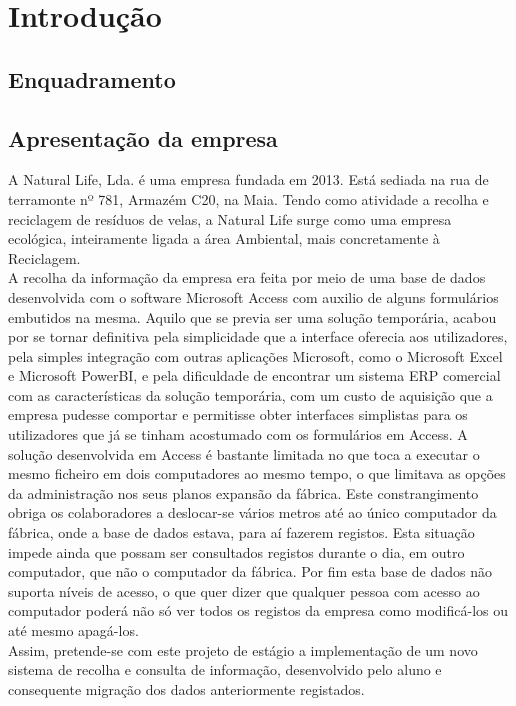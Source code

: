 \chapter{Introdução}
\label{cap:1}

\section{Enquadramento}

\section{Apresentação da empresa}
A Natural Life, Lda. é uma empresa fundada em 2013. Está sediada na rua de terramonte nº 781, Armazém C20, na Maia. Tendo como atividade a recolha e reciclagem de resíduos de velas, a Natural Life surge como uma empresa ecológica, inteiramente ligada a área Ambiental, mais concretamente à Reciclagem.\cite{NaturalLife}\\
A recolha da informação da empresa era feita por meio de uma base de dados desenvolvida com o software Microsoft Access\label{sym:MS_ACCESS} com auxilio de alguns formulários embutidos na mesma. Aquilo que se previa ser uma solução temporária, acabou por se tornar definitiva pela simplicidade que a interface oferecia aos utilizadores, pela simples integração com outras aplicações Microsoft, como o Microsoft Excel\label{sym:MS_EXCEL} e Microsoft PowerBI\label{sym:MS_POWERBI}, e pela dificuldade de encontrar um sistema ERP\label{sym:ERP} comercial com as características da solução temporária, com um custo de aquisição que a empresa pudesse comportar e permitisse obter interfaces simplistas para os utilizadores que já se tinham acostumado com os formulários em Access.
A solução desenvolvida em Access é bastante limitada no que toca a executar o mesmo ficheiro em dois computadores ao mesmo tempo, o que limitava as opções da administração nos seus planos expansão da fábrica. Este constrangimento obriga os colaboradores a deslocar-se vários metros até ao único computador da fábrica, onde a base de dados estava, para aí fazerem registos. Esta situação impede ainda que possam ser consultados registos durante o dia, em outro computador, que não o computador da fábrica. Por fim esta base de dados não suporta níveis de acesso, o que quer dizer que qualquer pessoa com acesso ao computador poderá não só ver todos os registos da empresa como modificá-los ou até mesmo apagá-los.\\
Assim, pretende-se com este projeto de estágio a implementação de um novo sistema de recolha e consulta de informação, desenvolvido pelo aluno e consequente migração dos dados anteriormente registados.
\newpage




